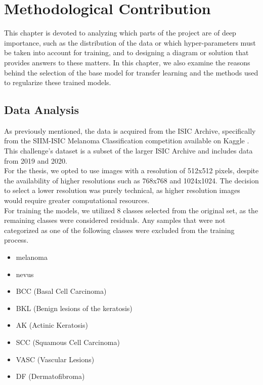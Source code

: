 \chapter{Methodological Contribution} \label{cap:contrib}

This chapter is devoted to analyzing which parts of the project are of deep
importance, such as the distribution of the data or which hyper-parameters must
be taken into account for training, and to designing a diagram or solution that
provides answers to these matters. In this chapter, we also examine the reasons
behind the selection of the base model for transfer learning and the methods
used to regularize these trained models.

\section{Data Analysis} \label{sec:data-analysis}

As previously mentioned, the data is acquired from the ISIC Archive,
specifically from the SIIM-ISIC Melanoma Classification competition available
on Kaggle \cite{ISICKaggle}. This challenge's dataset is a subset of the larger
ISIC Archive and includes data from 2019 and 2020. \\

For the thesis, we opted to use images with a resolution of 512x512 pixels,
despite the availability of higher resolutions such as 768x768 and 1024x1024.
The decision to select a lower resolution was purely technical, as higher
resolution images would require greater computational resources. \\

For training the models, we utilized 8 classes selected from the original set,
as the remaining classes were considered residuals. Any samples that were not
categorized as one of the following classes were excluded from the training
process.

\begin{itemize}
  \item melanoma
  \item nevus
  \item BCC (Basal Cell Carcinoma)
  \item BKL (Benign lesions of the keratosis)
  \item AK (Actinic Keratosis)
  \item SCC (Squamous Cell Carcinoma)
  \item VASC (Vascular Lesions)
  \item DF (Dermatofibroma)
\end{itemize}

